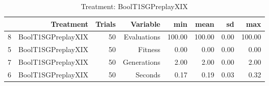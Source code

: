 \begin{table}[ht]
\centering
\begin{tabular}{rrrrrrrr}
  \hline
 & Treatment & Trials & Variable & min & mean & sd & max \\ 
  \hline
8 & BoolT1SGPreplayXIX &  50 & Evaluations & 100.00 & 100.00 & 0.00 & 100.00 \\ 
  5 & BoolT1SGPreplayXIX &  50 & Fitness & 0.00 & 0.00 & 0.00 & 0.00 \\ 
  7 & BoolT1SGPreplayXIX &  50 & Generations & 2.00 & 2.00 & 0.00 & 2.00 \\ 
  6 & BoolT1SGPreplayXIX &  50 & Seconds & 0.17 & 0.19 & 0.03 & 0.32 \\ 
   \hline
\end{tabular}
\caption{Treatment: BoolT1SGPreplayXIX} 
\end{table}
